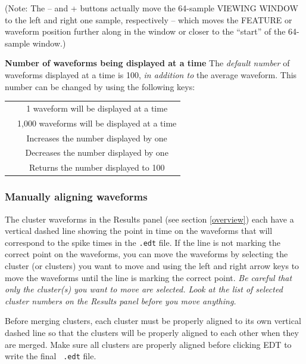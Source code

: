 \documentclass[12pt]{article}
\begin{document}
\begin{description}
  (Note: The -- and + buttons actually move the 64-sample VIEWING
  WINDOW to the left and right one sample, respectively -- which moves
  the FEATURE or waveform position further along in the window or
  closer to the ``start'' of the 64-sample window.)
\item{\textbf{Number of waveforms being displayed at a time}} The
  \textit{default number} of waveforms displayed at a time is 100,
  \textit{in addition to} the average waveform.  This number can be
  changed by using the following keys:
  \begin{center}
    \begin{tabular}{cc}
      \centering{ $\leftarrow $} & { 1 waveform will be displayed at a time}\\
      \centering{ $\rightarrow $} & { 1,000 waveforms will be displayed at a time}\\
      \centering{ $\uparrow $} & { Increases the number displayed by one}\\
      \centering{ $\downarrow $} & { Decreases the number displayed by one}\\
      \centering{ {\sf Home}} & { Returns the number displayed to 100}\\
    \end{tabular}
  \end{center}
\end{description}

\subsubsection{Manually aligning waveforms}
\label{alignment}
The cluster waveforms in the Results panel (see section
\ref{overview}) each have a vertical dashed line showing the point in
time on the waveforms that will correspond to the spike times in the
{\tt .edt} file.  If the line is not marking the correct point on the
waveforms, you can move the waveforms by selecting the cluster (or
clusters) you want to move and using the left and right arrow keys to
move the waveforms until the line is marking the correct point.
\emph{Be careful that only the cluster(s) you want to move are
  selected.  Look at the list of selected cluster numbers on the
  Results panel before you move anything.}

Before merging clusters, each cluster must be properly aligned to its
own vertical dashed line so that the clusters will be properly aligned
to each other when they are merged.  Make sure all clusters are
properly aligned before clicking {\sf EDT} to write the final {\tt
  .edt} file.
\end{document}
